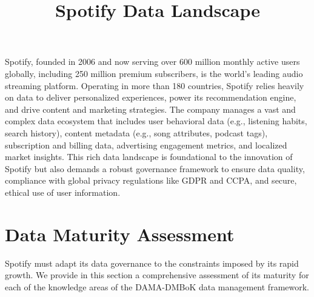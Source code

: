 \documentclass[11pt,a4paper,computermodern]{article}
\title{Spotify Data Landscape}
\date{}
\begin{document}
\maketitle

\vspace{-10mm}

Spotify, founded in 2006 and now serving over 600 million monthly active users globally, including 250 million premium subscribers, is the world’s leading audio streaming platform. Operating in more than 180 countries, Spotify relies heavily on data to deliver personalized experiences, power its recommendation engine, and drive content and marketing strategies. The company manages a vast and complex data ecosystem that includes user behavioral data (e.g., listening habits, search history), content metadata (e.g., song attributes, podcast tags), subscription and billing data, advertising engagement metrics, and localized market insights. This rich data landscape is foundational to the innovation of Spotify but also demands a robust governance framework to ensure data quality, compliance with global privacy regulations like GDPR and CCPA, and secure, ethical use of user information.


\section*{Data Maturity Assessment}

Spotify must adapt its data governance to the constraints imposed by its rapid growth. We provide in this section a comprehensive assessment of its maturity for each of the knowledge areas of the DAMA-DMBoK data management framework.
\end{document}
